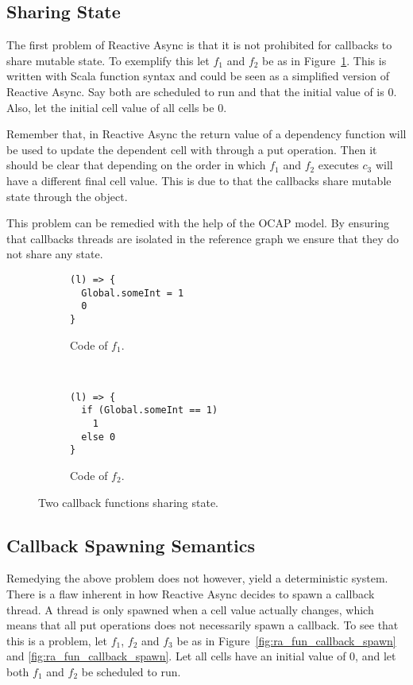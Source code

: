 \subsection{Sharing State}%
\label{sub:sharing_state}

The first problem of Reactive Async is that it is not prohibited for callbacks
to share mutable state. To exemplify this let $f_1$ and $f_2$ be as in
Figure~\ref{fig:ra_fun_shared_state}. This is written with Scala function syntax
and could be seen as a simplified version of Reactive Async. Say both are
scheduled to run and that the initial value of  is $0$.
Also, let the initial cell value of all cells be $0$.  

Remember that, in Reactive Async the return value of a dependency function will
be used to update the dependent cell with through a put operation. Then it
should be clear that depending on the order in which $f_1$ and $f_2$ executes
$c_3$ will have a different final cell value. This is due to that the callbacks
share mutable state through the  object.

This problem can be remedied with the help of the OCAP model. By ensuring that
callbacks threads are isolated in the reference graph we ensure that they do not
share any state.

\begin{figure}
  \begin{subfigure}[b]{0.5\textwidth}
    \begin{lstlisting}
(l) => {
  Global.someInt = 1
  0
}
    \end{lstlisting}
    \caption{Code of $f_1$.}
  \end{subfigure}
  ~
  \begin{subfigure}[b]{0.5\textwidth}
    \begin{lstlisting}
(l) => {
  if (Global.someInt == 1)
    1
  else 0
}
    \end{lstlisting}
    \caption{Code of $f_2$.}
  \end{subfigure}
  \caption{Two callback functions sharing state.}
  \label{fig:ra_fun_shared_state}
\end{figure}


\subsection{Callback Spawning Semantics}%
\label{sub:callback_spawning_semantics}

Remedying the above problem does not however, yield a deterministic system.
There is a flaw inherent in how Reactive Async decides to spawn a callback
thread. A thread is only spawned when a cell value actually changes, which means
that all put operations does not necessarily spawn a callback. To see that this
is a problem, let $f_1$, $f_2$ and $f_3$ be as in
Figure~\ref{fig:ra_fun_callback_spawn} and \ref{fig:ra_fun_callback_spawn}. Let
all cells have an initial value of $0$, and let both $f_1$ and $f_2$ be
scheduled to run.

